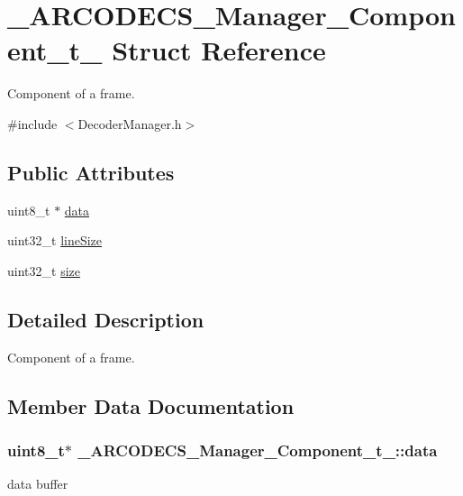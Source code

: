 \hypertarget{struct__ARCODECS__Manager__Component__t__}{}\section{\+\_\+\+A\+R\+C\+O\+D\+E\+C\+S\+\_\+\+Manager\+\_\+\+Component\+\_\+t\+\_\+ Struct Reference}
\label{struct__ARCODECS__Manager__Component__t__}


Component of a frame.  




{\ttfamily \#include $<$Decoder\+Manager.\+h$>$}

\subsection*{Public Attributes}
\begin{DoxyCompactItemize}
\item 
uint8\+\_\+t $\ast$ \hyperlink{struct__ARCODECS__Manager__Component__t___a606943eddf1c545ab336a2d572a20d0e}{data}
\item 
uint32\+\_\+t \hyperlink{struct__ARCODECS__Manager__Component__t___a69699f5b967723699ccb523484808ab9}{line\+Size}
\item 
uint32\+\_\+t \hyperlink{struct__ARCODECS__Manager__Component__t___a30b2f6ff9dd1fccb7053a092ccb0f107}{size}
\end{DoxyCompactItemize}


\subsection{Detailed Description}
Component of a frame. 

\subsection{Member Data Documentation}
\hypertarget{struct__ARCODECS__Manager__Component__t___a606943eddf1c545ab336a2d572a20d0e}{}
\subsubsection[{data}]{\setlength{\rightskip}{0pt plus 5cm}uint8\+\_\+t$\ast$ \+\_\+\+A\+R\+C\+O\+D\+E\+C\+S\+\_\+\+Manager\+\_\+\+Component\+\_\+t\+\_\+\+::data}\label{struct__ARCODECS__Manager__Component__t___a606943eddf1c545ab336a2d572a20d0e}
data buffer \hypertarget{struct__ARCODECS__Manager__Component__t___a69699f5b967723699ccb523484808ab9}{}
